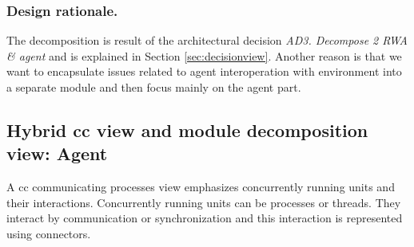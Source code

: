 \documentclass{llncs}
\begin{document}
\subsubsection{Design rationale.} The decomposition is result of the architectural decision \emph{AD3. Decompose 2 RWA \& agent} and is explained in Section \ref{sec:decisionview}. Another reason is that we want to encapsulate issues related to agent interoperation with environment into a separate module and then focus mainly on the agent part.

\subsection{Hybrid \gls{cc} view and module decomposition view: Agent}
\label{sec:hybrid-view}

A \gls{cc} communicating processes view emphasizes concurrently running units and their interactions. Concurrently running units can be processes or threads. They interact by communication or synchronization and this interaction is represented using connectors. %
\end{document}
